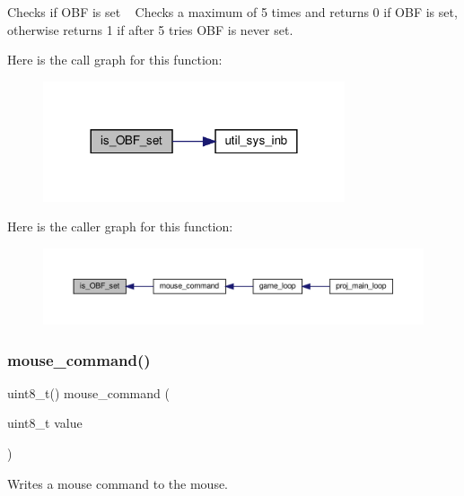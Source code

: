 Checks if O\+BF is set ~\newline
 Checks a maximum of 5 times and returns 0 if O\+BF is set, otherwise returns 1 if after 5 tries O\+BF is never set. 

Here is the call graph for this function\+:
\nopagebreak
\begin{figure}[H]
\begin{center}
\leavevmode
\includegraphics[width=252pt]{group__mouse_ga3a67eb6eb302f8140a3a6d16d40c86af_cgraph}
\end{center}
\end{figure}
Here is the caller graph for this function\+:
\nopagebreak
\begin{figure}[H]
\begin{center}
\leavevmode
\includegraphics[width=350pt]{group__mouse_ga3a67eb6eb302f8140a3a6d16d40c86af_icgraph}
\end{center}
\end{figure}
\mbox{\label{group__mouse_gacbf0aed06c0dbd0869075d318adf3147}} 
\subsubsection{\texorpdfstring{mouse\+\_\+command()}{mouse\_command()}}
{\footnotesize\ttfamily uint8\+\_\+t() mouse\+\_\+command (\begin{DoxyParamCaption}\item[{uint8\+\_\+t}]{value }\end{DoxyParamCaption})}



Writes a mouse command to the mouse. 

